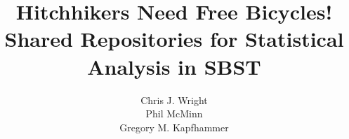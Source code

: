 \documentclass{sig-alternate}
\begin{document}


\title{Hitchhikers Need Free Bicycles! \\ Shared Repositories for Statistical Analysis in SBST\vspace*{-.1in}}


\author{
\alignauthor
Chris J. Wright\\
\alignauthor
Phil McMinn\\
\alignauthor
Gregory M. Kapfhammer\\
}

\maketitle





\vspace*{-.5em}

\scriptsize


\end{document}

